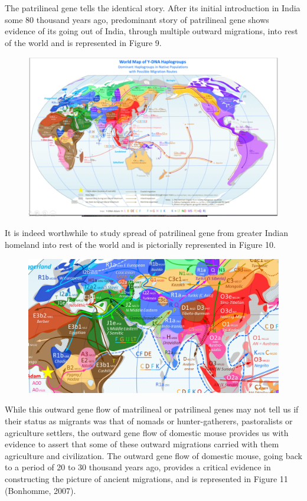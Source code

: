 The patrilineal gene tells the identical story. After its initial introduction in India some 80 thousand years ago, predominant story of patrilineal gene shows evidence of its going out of India, through multiple outward migrations, into rest of the world and is represented in Figure 9.

\begin{figure}[!htbp]
\includegraphics[scale=0.22]{images/8-09.jpg}
\caption{}\label{art8-fig09}
\end{figure}

It is indeed worthwhile to study spread of patrilineal gene from greater Indian homeland into rest of the world and is pictorially represented in Figure 10.

\newpage

\begin{figure}[!htbp]
\includegraphics[scale=0.21]{images/8-10.jpg}
\caption{}\label{art8-fig10}
\end{figure}

While this outward gene flow of matrilineal or patrilineal genes may not tell us if their status as migrants was that of nomads or hunter-gatherers, pastoralists or agriculture settlers, the outward gene flow of domestic mouse provides us with evidence to assert that some of these outward migrations carried with them agriculture and civilization. The outward gene flow of domestic mouse, going back to a period of 20 to 30 thousand years ago, provides a critical evidence in constructing the picture of ancient migrations, and is represented in Figure 11 (Bonhomme, 2007).

